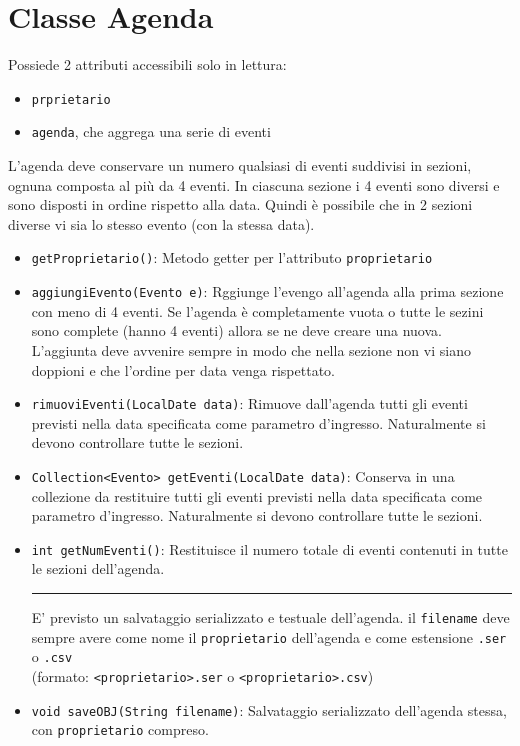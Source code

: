 \documentclass[12pt, a4paper]{article}
\begin{document}
	\section{Classe Agenda}
	Possiede 2 attributi accessibili solo in lettura: 
	\begin{itemize}[noitemsep, topsep=3pt]
		\item \texttt{prprietario}
		\item \texttt{agenda}, che aggrega una serie di eventi
	\end{itemize}
	L'agenda deve conservare un numero qualsiasi di eventi suddivisi in sezioni, ognuna composta al più da 4 eventi. In ciascuna sezione i 4 eventi sono diversi e sono disposti in ordine rispetto alla data. Quindi è possibile che in 2 sezioni diverse vi sia lo stesso evento (con la stessa data).
\begin{itemize}[noitemsep, topsep=3pt]
\item \texttt{getProprietario()}: Metodo getter per l'attributo \texttt{proprietario}

\item \texttt{aggiungiEvento(Evento e)}: Rggiunge l'evengo all'agenda alla prima sezione con meno di 4 eventi. Se l'agenda è completamente vuota o tutte le sezini sono complete (hanno 4 eventi) allora se ne deve creare una nuova.\\
L'aggiunta deve avvenire sempre in modo che nella sezione non vi siano doppioni e che l'ordine per data venga rispettato.

\item \texttt{rimuoviEventi(LocalDate data)}: Rimuove dall'agenda tutti gli eventi previsti nella data specificata come parametro d'ingresso. Naturalmente si devono controllare tutte le sezioni.

\item \texttt{Collection<Evento> getEventi(LocalDate data)}: Conserva in una collezione da restituire tutti gli eventi previsti nella data specificata come parametro d'ingresso. Naturalmente si devono controllare tutte le sezioni.

\item \texttt{int getNumEventi()}: Restituisce il numero totale di eventi contenuti in tutte le sezioni dell'agenda.

\hrule
E' previsto un salvataggio serializzato e testuale dell'agenda. il \texttt{filename} deve sempre avere come nome il \texttt{proprietario} dell'agenda e come estensione \texttt{.ser} o \texttt{.csv}\\
(formato: \texttt{<proprietario>.ser} o \texttt{<proprietario>.csv})
\item \texttt{void saveOBJ(String filename)}: Salvataggio serializzato dell'agenda stessa, con \texttt{proprietario} compreso. 


\end{itemize}
\end{document}
